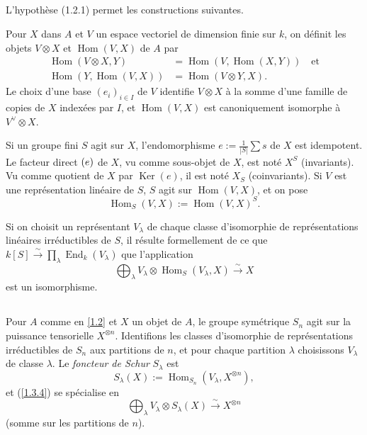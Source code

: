 \documentclass[11pt,a4paper]{article}
\theoremstyle{plain}
\theoremstyle{definition}
\DeclareMathOperator{\Hom}{Hom}
\DeclareMathOperator{\Ker}{Ker}
\let\Im\relax
\DeclareMathOperator{\Im}{Im}
\DeclareMathOperator{\End}{End}
\begin{document}
\subsection{}\label{1.3}

L'hypoth\`ese (1.2.1) permet les constructions suivantes.

Pour $X$ dans $A$ et $V$ un espace vectoriel de dimension finie sur $k$, on d\'efinit les objets $V\otimes X$ et $\Hom(V,X)$ de $A$ par
\begin{align}
\Hom(V\otimes X,Y) &= \Hom(V,\Hom(X,Y))\quad\text{et}\label{1.3.1}\\
\Hom(Y,\Hom(V,X)) &= \Hom(V\otimes Y,X).\label{1.3.2}
\end{align}
Le choix d'une base $(e_i)_{i\in I}$ de $V$ identifie $V\otimes X$ \`a la somme d'une famille de copies de $X$ index\'ees par $I$, et $\Hom(V,X)$ est canoniquement isomorphe \`a $V^\vee\otimes X$.

Si un groupe fini $S$ agit sur $X$, l'endomorphisme $e:=\frac{1}{|S|}\sum s$ de $X$ est idempotent. Le facteur direct $\Im(e)$ de $X$, vu comme sous-objet de $X$, est not\'e $X^S$ (invariants). Vu comme quotient de $X$ par $\Ker(e)$, il est not\'e $X_S$ (coinvariants). Si $V$ est une repr\'esentation lin\'eaire de $S$, $S$ agit sur $\Hom(V,X)$, et on pose
\begin{equation}\label{1.3.3}
\Hom_S(V,X):=\Hom(V,X)^S.
\end{equation}

Si on choisit un repr\'esentant $V_\lambda$ de chaque classe d'isomorphie de repr\'esentations lin\'eaires irr\'eductibles de $S$, il r\'esulte formellement de ce que $k[S]\xrightarrow{\sim}\prod_\lambda\End_k(V_\lambda)$ que l'application
\begin{equation}\label{1.3.4}
\bigoplus_\lambda V_\lambda\otimes\Hom_S(V_\lambda,X)\xrightarrow{\sim} X
\end{equation}
est un isomorphisme.

\subsection{}\label{1.4}

Pour $A$ comme en \ref{1.2} et $X$ un objet de $A$, le groupe sym\'etrique $S_n$ agit sur la puissance tensorielle $X^{\otimes n}$. Identifions les classes d'isomorphie de repr\'esentations irr\'eductibles de $S_n$ aux partitions de $n$, et pour chaque partition $\lambda$ choisissons $V_\lambda$ de classe $\lambda$. Le \emph{foncteur de Schur} $S_\lambda$ est
\begin{equation}\label{1.4.1}
S_\lambda(X):=\Hom_{S_n}(V_\lambda,X^{\otimes n}),
\end{equation}
et (\ref{1.3.4}) se sp\'ecialise en
\begin{equation}\label{1.4.2}
\bigoplus_\lambda V_\lambda\otimes S_\lambda(X)\xrightarrow{\sim} X^{\otimes n}
\end{equation}
(somme sur les partitions de $n$).
\end{document}
